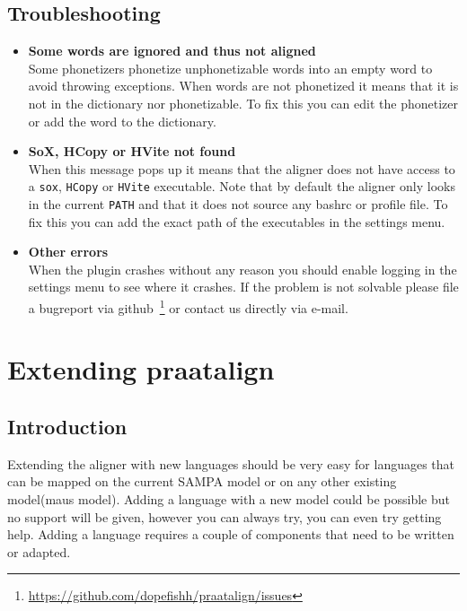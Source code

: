\section{Troubleshooting}
\begin{itemize}
	\item \textbf{Some words are ignored and thus not aligned}\\
		Some phonetizers phonetize unphonetizable words into an empty word to avoid
		throwing exceptions. When words are not phonetized it means that it is not
		in the dictionary nor phonetizable. To fix this you can edit the phonetizer
		or add the word to the dictionary.
	\item \textbf{SoX, HCopy or HVite not found}\\
		When this message pops up it means that the aligner does not have access to
		a \texttt{sox}, \texttt{HCopy} or \texttt{HVite} executable. Note that by
		default the aligner only looks in the current \texttt{PATH} and that it
		does not source any bashrc or profile file. To fix this you can add the
		exact path of the executables in the settings menu.
	\item \textbf{Other errors}\\
		When the plugin crashes without any reason you should enable logging in the
		settings menu to see where it crashes. If the problem is not solvable
		please file a bugreport via
		github~\footnote{\url{https://github.com/dopefishh/praatalign/issues}} or
		contact us directly via e-mail.
\end{itemize}


\chapter{Extending praatalign}
\section{Introduction}
Extending the aligner with new languages should be very easy for languages that
can be mapped on the current SAMPA model or on any other existing model(maus
model).
Adding a language with a new model could be possible but no support will be
given, however you can always try, you can even try getting help. Adding a
language requires a couple of components that need to be written or adapted.

